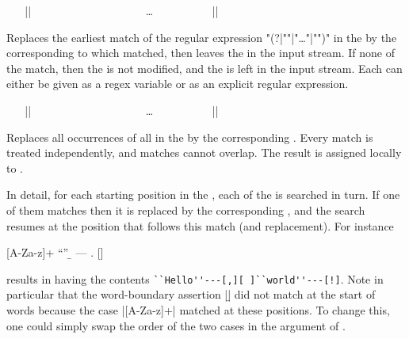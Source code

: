 \documentclass[oneside]{book}
\begin{document}
\begin{function}{\RegexReplaceCaseOnceTF}
\begin{syntax}
~ ~ |{|
~ ~ ~ ~  
~ ~ ~ ~  
~ ~ ~ ~ \ldots
~ ~ ~ ~  
~ ~ |}| 
~ ~  
\end{syntax}
Replaces the earliest match of the regular expression
"(?|""|"\dots"|"")" in the 
by the  corresponding to which
 matched, then leaves the  in the
input stream.  If none of the  match, then the
 is not modified, and the  is left in
the input stream.  Each  can either be given as a regex
variable or as an explicit regular expression.
\end{function}

\begin{function}{\RegexReplaceCaseAll}
\begin{syntax}
~ ~ |{|
~ ~ ~ ~  
~ ~ ~ ~  
~ ~ ~ ~ \ldots
~ ~ ~ ~  
~ ~ |}| 
\end{syntax}
Replaces all occurrences of all  in the 
by the corresponding . Every match is
treated independently, and matches cannot overlap. The result is
assigned locally to .
\par
In detail, for each starting position in the , each
of the  is searched in turn.  If one of them matches
then it is replaced by the corresponding , and the
search resumes at the position that follows this match (and
replacement).  For instance
\begin{codehigh}
\TlSet {}
\RegexReplaceCaseAll
  {
    {[A-Za-z]+} {``\0''}
    {\b} {---}
    {.} {[\0]}
  } \lTmpaTl
\end{codehigh}
results in  having the contents
\verb*|``Hello''---[,][ ]``world''---[!]|.  Note in particular that
the word-boundary assertion |\b| did not match at the start of words
because the case |[A-Za-z]+| matched at these positions.  To change
this, one could simply swap the order of the two cases in the
argument of .
\end{function}
\end{document}
